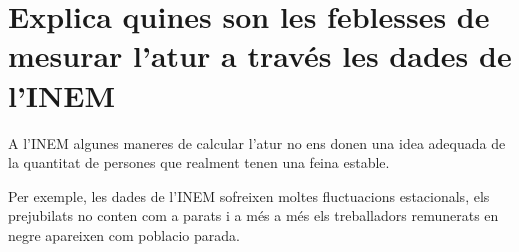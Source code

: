 \section{
  Explica quines son les feblesses de mesurar l’atur a través les dades de
  l’INEM
}

A l'INEM algunes maneres de calcular l'atur no ens donen una idea adequada
de la quantitat de persones que realment tenen una feina estable.

Per exemple, les dades de l'INEM sofreixen moltes fluctuacions estacionals,
els prejubilats no conten com a parats i a més a més els 
treballadors remunerats en negre apareixen com poblacio parada.
